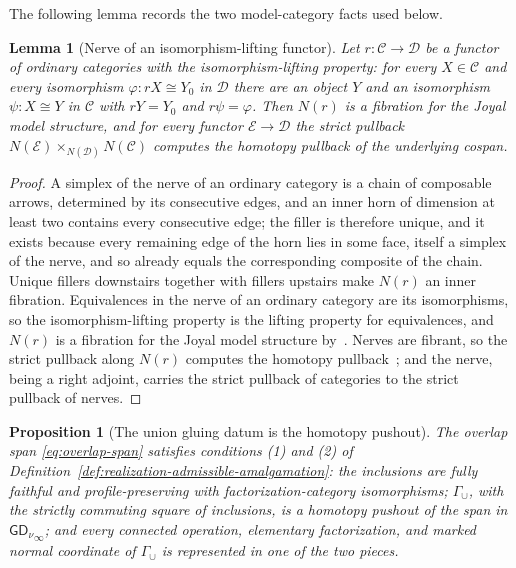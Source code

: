 \documentclass[11pt,letterpaper,twoside]{article}
\theoremstyle{plain}
\newtheorem{proposition}[theorem]{Proposition}
\newtheorem{lemma}[theorem]{Lemma}
\theoremstyle{definition}
\theoremstyle{remark}
\let\cite\citep
\newcommand{\LGrm}{\mathsf{GD}_{\nu}}
\begin{document}
The following lemma records the two model-category facts used below.

\begin{lemma}[Nerve of an isomorphism-lifting functor]\label{lem:isofibration-nerve}
Let \(r:\mathcal C\to\mathcal D\) be a functor of ordinary categories with the isomorphism-lifting property: for every \(X\in\mathcal C\) and every isomorphism \(\varphi:rX\cong Y_0\) in \(\mathcal D\) there are an object \(Y\) and an isomorphism \(\psi:X\cong Y\) in \(\mathcal C\) with \(rY=Y_0\) and \(r\psi=\varphi\).  Then \(N(r)\) is a fibration for the Joyal model structure, and for every functor \(\mathcal E\to\mathcal D\) the strict pullback \(N(\mathcal E)\times_{N(\mathcal D)}N(\mathcal C)\) computes the homotopy pullback of the underlying cospan.
\end{lemma}

\begin{proof}
A simplex of the nerve of an ordinary category is a chain of composable arrows, determined by its consecutive edges, and an inner horn of dimension at least two contains every consecutive edge; the filler is therefore unique, and it exists because every remaining edge of the horn lies in some face, itself a simplex of the nerve, and so already equals the corresponding composite of the chain.  Unique fillers downstairs together with fillers upstairs make \(N(r)\) an inner fibration.  Equivalences in the nerve of an ordinary category are its isomorphisms, so the isomorphism-lifting property is the lifting property for equivalences, and \(N(r)\) is a fibration for the Joyal model structure by~\cite[Cor.~2.4.6.5]{lurie2009htt}.  Nerves are fibrant, so the strict pullback along \(N(r)\) computes the homotopy pullback~\cite[Rem.~A.2.4.5]{lurie2009htt}; and the nerve, being a right adjoint, carries the strict pullback of categories to the strict pullback of nerves.
\end{proof}

\begin{proposition}[The union gluing datum is the homotopy pushout]\label{prop:overlap-pushout}
The overlap span \eqref{eq:overlap-span} satisfies conditions (1) and (2) of Definition~\ref{def:realization-admissible-amalgamation}: the inclusions are fully faithful and profile-preserving with factorization-category isomorphisms; \(\Gamma_\cup\), with the strictly commuting square of inclusions, is a homotopy pushout of the span in \({\LGrm}_\infty\); and every connected operation, elementary factorization, and marked normal coordinate of \(\Gamma_\cup\) is represented in one of the two pieces.
\end{proposition}
\end{document}
